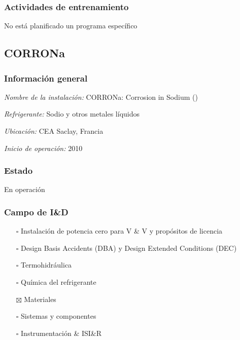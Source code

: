 \documentclass{article}
\begin{document}
\subsubsection*{Actividades de entrenamiento}
No está planificado un programa específico
\subsection{CORRONa}
\subsubsection*{Información general}
\textit{Nombre de la instalación: }CORRONa: Corrosion in Sodium ()

\textit{Refrigerante: }Sodio y otros metales líquidos

\textit{Ubicación: }CEA Saclay, Francia

\textit{Inicio de operación: }2010

\subsubsection*{Estado}
En operación

\subsubsection*{Campo de I\&D}
\begin{itemize}
\item[$\square$] Instalación de potencia cero para V \& V y propósitos de licencia
\item[$\square$] Design Basis Accidents (DBA) y Design Extended Conditions (DEC)
\item[$\square$] Termohidráulica
\item[$\square$] Química del refrigerante
\item[$\boxtimes$] Materiales
\item[$\square$] Sistemas y componentes
\item[$\square$] Instrumentación \& ISI\&R
\end{itemize}
\end{document}
